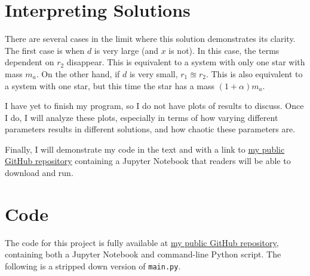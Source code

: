 \documentclass[preprint,titlepage,preprintnumbers,amsmath,amssymb,aps,11pt]{revtex4-2}
\begin{document}
\section{Interpreting Solutions}
There are several cases in the limit where this solution demonstrates its clarity. The first case is when $d$ is very large (and $x$ is not). In this case, the terms dependent on $r_2$ disappear. This is equivalent to a system with only one star with mass $m_a$. On the other hand, if $d$ is very small, $r_1\approxeq r_2$. This is also equivalent to a system with one star, but this time the star has a mass $(1+\alpha)m_a$.

I have yet to finish my program, so I do not have plots of results to discuss. Once I do, I will analyze these plots, especially in terms of how varying different parameters results in different solutions, and how chaotic these parameters are.

Finally, I will demonstrate my code in the text and with a link to \href{https://github.com/jasperswallen/PHYS304-Project}{my public GitHub repository}
containing a Jupyter Notebook that readers will be able to download and run.

\appendix
\section{Code}
The code for this project is fully available at \href{https://github.com/jasperswallen/PHYS304-Project}{my public GitHub repository},
containing both a Jupyter Notebook and command-line Python script. The following is a stripped down version of \texttt{main.py}.
\end{document}
